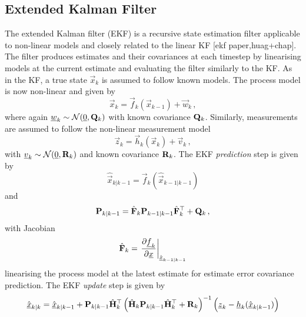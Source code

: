 % 
% 

\subsection{Extended Kalman Filter}\label{subsec:prelims:ekf}
The extended Kalman filter (EKF) is a recursive state estimation filter applicable to non-linear models and closely related to the linear KF [ekf paper,huag+chap]. The filter produces estimates and their covariances at each timestep by linearising models at the current estimate and evaluating the filter similarly to the KF. As in the KF, a true state $\vec{x}_k$ is assumed to follow known models. The process model is now non-linear and given by
\begin{equation}\label{eq:prelims:nonlin_gauss_process_model}
    \vec{x}_k = \vec{f}_k(\vec{x}_{k-1}) + \vec{w}_k\,,
\end{equation}
where again ${\underline{w}}_k \sim \mathcal{N}({\underline{0}}, {{\mathbf{Q}}}_k)$ with known covariance ${{\mathbf{Q}}}_k$. Similarly, measurements are assumed to follow the non-linear measurement model
\begin{equation}\label{eq:prelims:nonlin_gauss_measurement_model}
    \vec{z}_k = \vec{h}_k(\vec{x}_k) + \vec{v}_k\,,
\end{equation}
with ${\underline{v}}_k \sim \mathcal{N}({\underline{0}}, {{\mathbf{R}}}_k)$ and known covariance ${{\mathbf{R}}}_k$. The EKF \textit{prediction} step is given by
\begin{equation}\label{eq:prelims:ekf_est_predict}
    \hat{\vec{x}}_{k|k-1} = \vec{f}_k\left(\hat{\vec{x}}_{k-1|k-1}\right)
\end{equation}
and
\begin{equation}\label{eq:prelims:ekf_cov_predict}
    {\ensuremath{{\mathbf{P}}}}_{k|k-1} = \hat{{{\mathbf{F}}}}_k {{\mathbf{P}}}_{k-1|k-1} \hat{{{\mathbf{F}}}}_k^\top + {{\mathbf{Q}}}_k\,,
\end{equation}
with Jacobian
\begin{equation}\label{eq:prelims:ekf_predict_jacobian}
    \hat{{{\mathbf{F}}}}_k = \left.\frac{\partial {\underline{f}}_k}{\partial {\underline{x}}}\right|_{\hat{{\underline{x}}}_{k-1|k-1}}
\end{equation}
linearising the process model at the latest estimate for estimate error covariance prediction. The EKF \textit{update} step is given by
\begin{equation}\label{eq:prelims:ekf_est_update}
    \hat{{\underline{x}}}_{k|k} = \hat{{\underline{x}}}_{k|k-1}+{{\mathbf{P}}}_{k|k-1}\hat{{{\mathbf{H}}}}_k^\top\left(\hat{{{\mathbf{H}}}}_k{{\mathbf{P}}}_{k|k-1}\hat{{{\mathbf{H}}}}_k^\top + {{\mathbf{R}}}_k\right)^{-1}\left({\underline{z}}_k-{\underline{h}}_k(\hat{{\underline{x}}}_{k|k-1})\right)
\end{equation}
